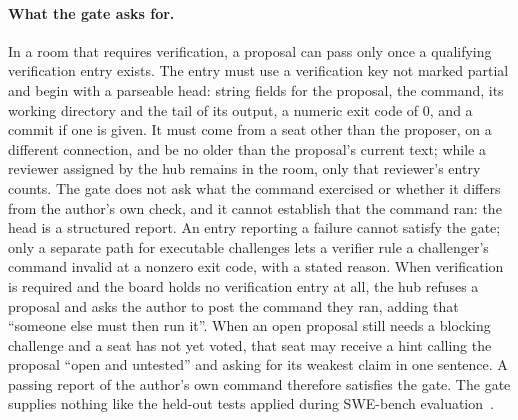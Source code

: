 \paragraph{What the gate asks for.} In a room that requires verification, a proposal can pass only once a qualifying verification entry exists. The entry must use a verification key not marked partial and begin with a parseable head: string fields for the proposal, the command, its working directory and the tail of its output, a numeric exit code of 0, and a commit if one is given. It must come from a seat other than the proposer, on a different connection, and be no older than the proposal's current text; while a reviewer assigned by the hub remains in the room, only that reviewer's entry counts. The gate does not ask what the command exercised or whether it differs from the author's own check, and it cannot establish that the command ran: the head is a structured report. An entry reporting a failure cannot satisfy the gate; only a separate path for executable challenges lets a verifier rule a challenger's command invalid at a nonzero exit code, with a stated reason. When verification is required and the board holds no verification entry at all, the hub refuses a proposal and asks the author to post the command they ran, adding that ``someone else must then run it''. When an open proposal still needs a blocking challenge and a seat has not yet voted, that seat may receive a hint calling the proposal ``open and untested'' and asking for its weakest claim in one sentence. A passing report of the author's own command therefore satisfies the gate. The gate supplies nothing like the held-out tests applied during SWE-bench evaluation~\cite{Jimenez2023}.

